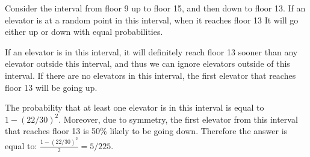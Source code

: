 \begin{solution}
	Consider the interval from floor 9 up to floor 15, and then down to floor 13. If an elevator is at a random point in this interval, when it reaches floor 13 It will go either up or down with equal probabilities.
	
	If an elevator is in this interval, it will definitely reach floor 13 sooner than any elevator outside this interval, and thus we can ignore elevators outside of this interval. If there are no elevators in this interval, the first elevator that reaches floor 13 will be going up.
	
	The probability that at least one elevator is in this interval is equal to 
	$1-(22/30)^2$.
	Moreover, due to symmetry, the first elevator from this interval that reaches floor 13 is 50\% likely to be going down. Therefore the answer is equal to:
	$\frac{1-(22/30)^2}{2} = 5/225.$
\end{solution}